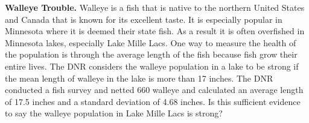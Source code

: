 \item \textbf{Walleye Trouble.} Walleye is a fish that is native to the northern United States and Canada that is known for its excellent taste. It is especially popular in Minnesota where it is deemed their state fish. As a result it is often overfished in Minnesota lakes, especially Lake Mille Lacs. One way to measure the health of the population is through the average length of the fish  because fish grow their entire lives. The DNR considers the walleye population in a lake to be strong if the mean length of walleye in the lake is more than 17 inches. The DNR conducted a fish survey and netted 660 walleye and calculated an average length of 17.5 inches and a standard deviation of 4.68 inches. Is this sufficient evidence to say the walleye population in Lake Mille Lacs is strong?  

